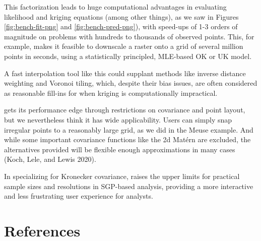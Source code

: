 This factorization leads to huge computational advantages in evaluating likelihood and kriging equations (among other things), as we saw in Figures \ref{fig:bench-fit-png} and \ref{fig:bench-pred-png}), with speed-ups of 1-3 orders of magnitude on problems with hundreds to thousands of observed points. This, for example, makes it feasible to downscale a raster onto a grid of several million points in seconds, using a statistically principled, MLE-based OK or UK model.

A fast interpolation tool like this could supplant methods like inverse distance weighting and Voronoi tiling, which, despite their bias issues, are often considered as reasonable fill-ins for when kriging is computationally impractical.

 gets its performance edge through restrictions on covariance and point layout, but we nevertheless think it has wide applicability. Users can simply snap irregular points to a reasonably large grid, as we did in the Meuse example. And while some important covariance functions like the 2d Matérn are excluded, the alternatives provided will be flexible enough approximations in many cases (Koch, Lele, and Lewis 2020).

In specializing for Kronecker covariance,  raises the upper limits for practical sample sizes and resolutions in SGP-based analysis, providing a more interactive and less frustrating user experience for analysts.

\hypertarget{references}{%
\section*{References}\label{references}}

